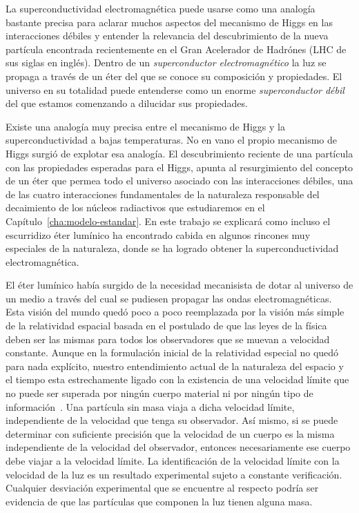 
  La superconductividad electromagnética puede usarse como una analogía bastante precisa para aclarar muchos aspectos del mecanismo de Higgs en las interacciones débiles y  entender la relevancia del descubrimiento de la nueva partícula encontrada recientemente en el Gran Acelerador de Hadrónes (LHC de sus siglas en inglés).  Dentro de un \emph{superconductor electromagnético} la luz se propaga a través de un éter del que se conoce su composición y propiedades. El universo en su totalidad puede entenderse como un enorme \emph{superconductor débil} del que estamos comenzando a dilucidar sus propiedades.


Existe una analogía muy precisa entre el mecanismo de Higgs y la superconductividad a bajas temperaturas. No en vano el propio mecanismo de Higgs surgió de explotar esa analogía. El descubrimiento reciente de una partícula con las propiedades esperadas para el Higgs, apunta al resurgimiento del concepto de  un éter que permea todo el universo asociado con las interacciones débiles, una de las cuatro interacciones fundamentales de la naturaleza responsable del decaimiento de los núcleos radiactivos que estudiaremos en el Capítulo~\ref{cha:modelo-estandar}. En este trabajo se explicará como incluso el escurridizo éter lumínico ha encontrado cabida en algunos rincones muy especiales de la naturaleza, donde se ha logrado obtener la superconductividad electromagnética.   

El éter lumínico había surgido de la necesidad mecanisista de dotar al universo de un medio a través del cual se pudiesen propagar las ondas electromagnéticas. Esta visión del mundo quedó poco a poco reemplazada por la visión más simple de la relatividad espacial basada en el postulado de que las leyes de la física deben ser las mismas para todos los observadores que se muevan a velocidad constante. Aunque en la formulación inicial de la relatividad especial no quedó para nada explícito, nuestro entendimiento actual de la naturaleza del espacio y el tiempo esta estrechamente ligado con la existencia de una velocidad límite que no puede ser superada por ningún cuerpo material ni por ningún tipo de información~\cite{Silagadze:2007eb}. Una partícula sin masa viaja a dicha velocidad límite, independiente de la velocidad que tenga su observador. Así mismo, si se puede determinar con suficiente precisión que la velocidad de un cuerpo es la misma independiente de la velocidad del observador, entonces necesariamente ese cuerpo debe viajar a la velocidad límite. La identificación de la velocidad límite con la velocidad de la luz es un resultado experimental sujeto a constante verificación. Cualquier desviación experimental que se encuentre al respecto podría ser evidencia de que las partículas que componen la luz tienen alguna masa.

